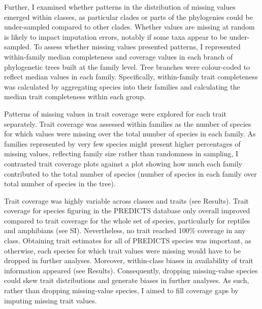 Further, I examined whether patterns in the distribution of missing values emerged within classes, as particular clades or parts of the phylogenies could be under-sampled compared to other clades.
Whether values are missing at random is likely to impact imputation errors, notably if some taxa appear to be under-sampled. To assess whether missing values presented patterns, I represented within-family median completeness and coverage values in each branch of phylogenetic trees built at the family level. Tree branches were colour-coded to reflect median values in each family. Specifically, within-family trait completeness was calculated by aggregating species into their families and calculating the median trait completeness within each group. 

Patterns of missing values in trait coverage were explored for each trait separately. Trait coverage was assessed within families as the number of species for which values were missing over the total number of species in each family. As families represented by very few species might present higher percentages of missing values, reflecting family size rather than randomness in sampling, I contrasted trait coverage plots against a plot showing how much each family contributed to the total number of species (number of species in each family over total number of species in the tree).

Trait coverage was highly variable across classes and traits (see Results). Trait coverage for species figuring in the PREDICTS database only overall improved compared to trait coverage for the whole set of species, particularly for reptiles and amphibians (see SI). Nevertheless, no trait reached 100\% coverage in any class. Obtaining trait estimates for all of PREDICTS species was important, as otherwise, each species for which trait values were missing would have to be dropped in further analyses. Moreover, within-class biases in availability of trait information appeared (see Results). Consequently, dropping missing-value species could skew trait distributions and generate biases in further analyses. As such, rather than dropping missing-value species, I aimed to fill coverage gaps by imputing missing trait values. 

